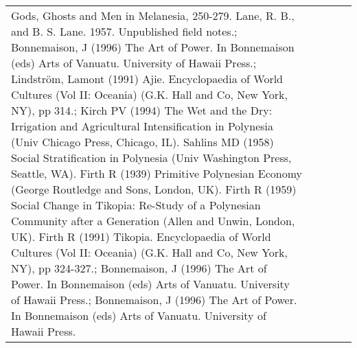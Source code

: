\begin{table}[ht]
\begin{tabular}{p{5cm}p{2cm}p{2cm}p{2cm}p{2cm}}
Gods, Ghosts and Men in Melanesia, 250-279. Lane, R. B., and B. S. Lane. 1957. Unpublished field notes.; Bonnemaison, J (1996) The Art of Power. In Bonnemaison (eds) Arts of Vanuatu. University of Hawaii Press.; Lindström, Lamont (1991) Ajie. Encyclopaedia of World Cultures (Vol II: Oceania) (G.K. Hall and Co, New York, NY), pp 314.; Kirch PV (1994) The Wet and the Dry: Irrigation and Agricultural Intensification in Polynesia (Univ Chicago Press, Chicago, IL). Sahlins MD (1958) Social Stratification in Polynesia (Univ Washington Press, Seattle, WA). Firth R (1939) Primitive Polynesian Economy (George Routledge and Sons, London, UK). Firth R (1959) Social Change in Tikopia: Re-Study of a Polynesian Community after a Generation (Allen and Unwin, London, UK). Firth R (1991) Tikopia. Encyclopaedia of World Cultures (Vol II: Oceania) (G.K. Hall and Co, New York, NY), pp 324-327.; Bonnemaison, J (1996) The Art of Power. In Bonnemaison (eds) Arts of Vanuatu. University of Hawaii Press.; Bonnemaison, J (1996) The Art of Power. In Bonnemaison (eds) Arts of Vanuatu. University of Hawaii Press. \\ 

\end{tabular}
\end{table}
